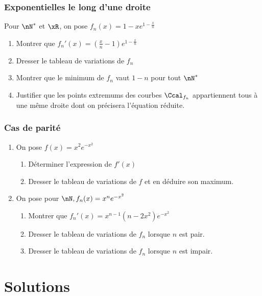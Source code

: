 \documentclass[oneside,12pt]{book}          %
\begin{document}
\subsection{Exponentielles le long d'une droite}
Pour $\nN^*$ et $\xR$, on pose $f_n(x)=1-xe^{\left. 1-\frac{x}{n}\right.} $
\begin{enumerate}
    \item Montrer que $f_n'(x)=\left(\frac{x}{n}-1\right)e^{1-\frac{x}{n}}$
    \item Dresser le tableau de variations de $f_n$
    \item Montrer que le minimum de $f_n$ vaut $1-n$ pour tout $\nN^*$
    \item Justifier que les points extremums des courbes $\Ccal_{f_n}$ appartiennent tous à une même droite dont on précisera l'équation réduite.
\end{enumerate}



\subsection{Cas de parité}
\begin{enumerate}
    \item On pose $f(x)=x^2e^{-x^2}$
    \begin{enumerate}
        \item Déterminer l'expression de $f'(x)$
        \item Dresser le tableau de variations de $f$ et en déduire son maximum.
    \end{enumerate}
    \item On pose pour $\nN, f_n(x)=x^ne^{-x^2}$
    \begin{enumerate}
        \item Montrer que $f_n'(x)=x^{n-1}\left(n-2x^2\right)e^{-x^2}$
        \item Dresser le tableau de variations de $f_n$ lorsque $n$ est pair.
        \item Dresser le tableau de variations de $f_n$ lorsque $n$ est impair.
    \end{enumerate}
\end{enumerate}



\chapter{Solutions}
\newpage

\end{document}
